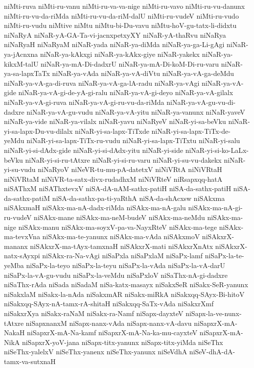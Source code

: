 {niMti-ruva
niMti-ru-vanu
niMti-ru-va-va-nige
niMti-ru-vavo
niMti-ru-vu-danunx
niMti-ru-vu-da-riMda
niMti-ru-vu-da-riM-dalU
niMti-ru-vudeV
niMti-ru-vudo
niMti-ru-vudu
niMtive
niMtu
niMtu-bi-Du-vavu
niMtu-hoV-gu-tatx-li-didxtu
niNaRyA
niNaR-yA-GA-Ta-vi-jacnxpetxyXY
niNaR-yA-thaRvu
niNaRya
niNaRyaH
niNaRyaM
niNaR-yada
niNaR-ya-diMda
niNaR-ya-ga-Li-gAgi
niNaR-ya-jAcnxna
niNaR-ya-kAkxgi
niNaR-ya-kAkx-giye
niNaR-yakekx
niNaR-ya-kikxM-talU
niNaR-ya-mA-Di-dadxrU
niNaR-ya-mA-Di-koM-Di-ru-varu
niNaR-ya-sa-lapxTaTx
niNaR-ya-vAda
niNaR-ya-vA-diVtu
niNaR-ya-vA-ga-deMdu
niNaR-ya-vA-ga-di-ruva
niNaR-ya-vA-ga-lA-radu
niNaR-ya-vAgi
niNaR-ya-vA-gide
niNaR-ya-vA-gi-de-yA-gi-ralu
niNaR-ya-vA-gi-deyo
niNaR-ya-vA-gilalx
niNaR-ya-vA-gi-ruva
niNaR-ya-vA-gi-ru-vu-da-riMda
niNaR-ya-vA-gu-vu-di-dadxre
niNaR-ya-vA-gu-vudu
niNaR-ya-vA-yitu
niNaR-ya-vanunx
niNaR-yaveV
niNaR-ya-vide
niNaR-ya-vilalx
niNaR-yavu
niNaRyeV
niNaR-yi-sa-beVku
niNaR-yi-sa-lapx-Du-vu-dilalx
niNaR-yi-sa-lapx-TiTxde
niNaR-yi-sa-lapx-TiTx-de-yeMdu
niNaR-yi-sa-lapx-TiTx-ru-vudu
niNaR-yi-sa-lapx-TiTxtu
niNaR-yi-salu
niNaR-yi-si-dAdx-gide
niNaR-yi-si-dAdx-yitu
niNaR-yi-side
niNaR-yi-si-ko-LaLx-beVku
niNaR-yi-si-ru-tAtxre
niNaR-yi-si-ru-varu
niNaR-yi-su-vu-dakekx
niNaR-yi-su-vudu
niNaRyoV
niNeVR-tu-mu-pA-datetxV
niNiVRtA
niNiVRtaH
niNiVRtaM
niNiVR-ta-satx-divx-rudadhxM
niNiVRteV
niRsapxqq-hatA
niSAThxM
niSAThxtevxV
niSA-dA-nAM-sathx-patiH
niSA-da-sathx-patiH
niSA-da-sathx-patiM
niSA-da-sathx-pa-ti-yaRthA
niSA-da-shAcxsw
niSAkxma
niSAkxmaH
niSAkx-ma-nA-dadx-riMda
niSAkx-ma-nA-galu
niSAkx-ma-nA-gi-ru-vudeV
niSAkx-mane
niSAkx-ma-neM-budeV
niSAkx-ma-neMdu
niSAkx-ma-nige
niSAkx-manu
niSAkx-ma-soyxV-pa-va-NayxRteV
niSAkx-ma-tege
niSAkx-ma-tevxVna
niSAkx-ma-te-yanunx
niSAkx-ma-vAda
niSAkxmoV
niSAkxrX-mananx
niSAkxrX-ma-tAyx-tamxnaH
niSAkxrX-mati
niSAkxrXnAtx
niSAkxrX-natx-sAyxpi
niSAkx-ra-Na-vAgi
niSaPxla
niSaPxlaM
niSaPx-lamf
niSaPx-la-te-yeMba
niSaPx-la-teyo
niSaPx-la-teyu
niSaPx-la-vAda
niSaPx-la-vA-darU
niSaPx-la-vA-gu-vudu
niSaPx-la-veMdu
niSaPxloV
niSaThx-nA-gi-dadxre
niSaThx-rAda
niSada
niSadaM
niSa-katx-masayx
niSakxSeR
niSakx-SeR-yanunx
niSakxlaM
niSakx-la-nAda
niSakxmAR
niSakx-miRkA
niSakxqq-SAyx-Bi-hitoV
niSakxqq-SAyx-nA-tamx-rA-shitaH
niSakxqq-SaTx-vAda
niSakxrXmf
niSakxrXya
niSakx-raNaM
niSakx-ra-Namf
niSapx-dayxteV
niSapx-la-ve-nunx-tAtxre
niSapxnanxM
niSapx-nanx-vAda
niSapx-nanx-vA-davu
niSapxrX-mA-NakaH
niSapxrX-mA-Na-kamf
niSapxrX-mA-Na-ka-mu-cayxteV
niSapxrX-mA-NikA
niSapxrX-yoV-jana
niSapx-titx-yanunx
niSapx-titx-yiMda
niSeThx
niSeThx-yalelxV
niSeThx-yanenx
niSeThx-yanunx
niSeVdhA
niSeV-dhA-dA-tamx-va-sutxnaH
}
